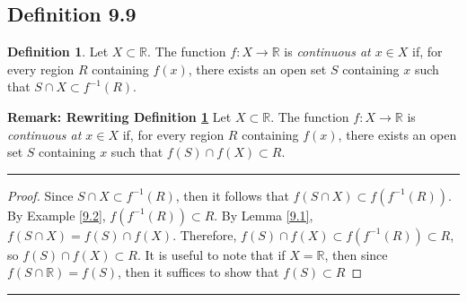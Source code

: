 \documentclass[openany, amssymb, psamsfonts]{amsart}
\newcommand{\bbR}{\mathbb{R}}
\theoremstyle{definition}
\newtheorem{defn}{Definition}[section]
\numberwithin{equation}{section}
\begin{document}
\subsection*{Definition 9.9}
\begin{defn}
\label{9.9}
Let $X\subset \bbR.$  The function $f\colon X\to \bbR$ is {\em continuous at $x\in X$} if, 
for every region $R$  containing $f(x)$, there exists an open set $S$ containing $x$ such that $S\cap X\subset f^{-1}( R)$.
\end{defn} 
\newpage
\textbf{Remark: Rewriting Definition \ref{9.9}} Let $X\subset \bbR.$  The function $f\colon X\to \bbR$ is {\em continuous at $x\in X$} if, for every region $R$  containing $f(x)$, there exists an open set $S$ containing $x$ such that $f(S) \cap f(X)\subset R$. 
\vspace{4pt}     \hrule   \vspace{4pt} \begin{proof}
    Since $S\cap X \subset f^{-1}(R)$, then it follows that $f(S\cap X) \subset f(f^{-1}(R))$. By Example \ref{9.2}, $f(f^{-1}(R)) \subset R$. By Lemma \ref{9.1}, $f(S\cap X) = f(S) \cap f(X)$. Therefore, $f(S)\cap f(X) \subset f(f^{-1}(R)) \subset R$, so $f(S)\cap f(X)\subset R$. It is useful to note that if $X= \bbR$, then since $f(S\cap \bbR) = f(S)$, then it suffices to show that $f(S) \subset R$
\end{proof}\vspace{4pt}     \hrule   \vspace{4pt}
\end{document}
